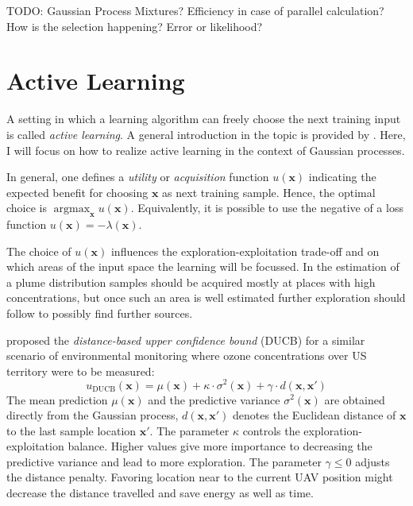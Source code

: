 \documentclass[11pt,a4paper]{scrreprt}
\newcommand{\vc}[1]{\bm{#1}}
\DeclareMathOperator*{\argmax}{argmax}
\newcommand{\ped}[1]{_{\mathrm{#1}}}
\newcommand{\newterm}[1]{\emph{#1}}
\begin{document}
TODO: Gaussian Process Mixtures? Efficiency in case of parallel calculation?
How is the selection happening? Error or likelihood?

\section{Active Learning}
A setting in which a learning algorithm can freely choose the next training 
input is called \newterm{active learning}. A general introduction in the topic 
is provided by \textcite{Settles:2009vo}. Here, I will focus on how to realize 
active learning in the context of Gaussian processes.

In general, one defines a \newterm{utility} or \newterm{acquisition} function 
$u(\vc x)$ indicating the expected benefit for choosing $\vc x$ as next training 
sample. Hence, the optimal choice is $\argmax_{\vc x} u(\vc x)$. Equivalently, 
it is possible to use the negative of a loss function $u(\vc x) = - \lambda(\vc 
x)$.

The choice of $u(\vc x)$ influences the exploration-exploitation trade-off and 
on which areas of the input space the learning will be focussed. In the 
estimation of a plume distribution samples should be acquired mostly at places 
with high concentrations, but once such an area is well estimated further 
exploration should follow to possibly find further sources.

\Textcite{Marchant:2012wb} proposed the \newterm{distance-based upper confidence 
    bound} (DUCB) for a similar scenario of environmental monitoring where ozone 
concentrations over US territory were to be measured:
\begin{equation}
    u\ped{DUCB}(\vc x) = \mu(\vc x) + \kappa \cdot \sigma^2(\vc x) + \gamma 
    \cdot d(\vc x, \vc x')
\end{equation}
The mean prediction $\mu(\vc x)$ and the predictive variance $\sigma^2(\vc x)$ 
are obtained directly from the Gaussian process, $d(\vc x, \vc x')$ denotes the 
Euclidean distance of $\vc x$ to the last sample location $\vc x'$. The 
parameter $\kappa$ controls the exploration-exploitation balance. Higher values 
give more importance to decreasing the predictive variance and lead to more 
exploration. The parameter $\gamma \leq 0$ adjusts the distance penalty.  
Favoring location near to the current UAV position might decrease the distance 
travelled and save energy as well as time.
\end{document}
